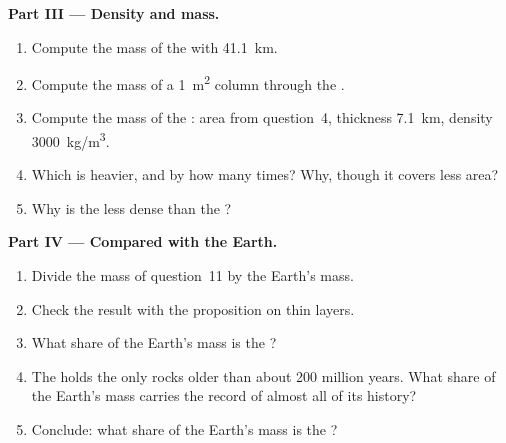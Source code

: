 \begin{problem}
\medskip
\noindent\textbf{Part III --- Density and mass.}
\begin{enumerate}[resume]
  \item Compute the mass of the  with \qty{41.1}{km}.
  \item Compute the mass of a \qty{1}{m^2} column through the .
  \item Compute the mass of the : area from question~4,
        thickness \qty{7.1}{km}, density \qty{3000}{kg/m^3}.
  \item Which is heavier, and by how many times? Why, though it covers less
        area?
  \item Why is the  less dense than the ?
\end{enumerate}

\medskip
\noindent\textbf{Part IV --- Compared with the Earth.}
\begin{enumerate}[resume]
  \item Divide the mass of question~11 by the Earth's mass.
  \item Check the result with the proposition on thin layers.
  \item What share of the Earth's mass is the ?
  \item The  holds the only rocks older than about 200
        million years. What share of the Earth's mass carries the record of
        almost all of its history?
  \item Conclude: what share of the Earth's mass is the ?
\end{enumerate}
\end{problem}
